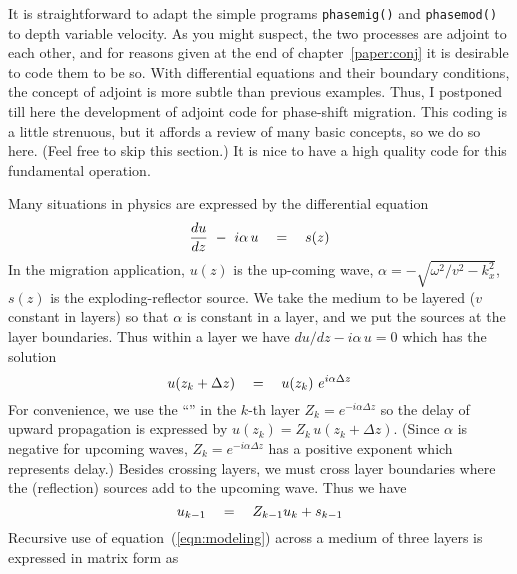 It is straightforward to adapt the simple programs
\texttt{phasemig()}  and
\texttt{phasemod()} 
to depth variable velocity.
As you might suspect, the two processes are adjoint to each other,
and for reasons given at the end of chapter~\ref{paper:conj}
it is desirable to code them to be so.
With differential equations and their boundary conditions,
the concept of adjoint is more subtle than previous examples.
Thus, I postponed till here the development of adjoint code
for phase-shift migration.
This coding is a little strenuous,
but it affords a review of many basic concepts,
so we do so here. (Feel free to skip this section.)
It is nice to have a high quality code for this fundamental operation.

\par
Many situations in physics are expressed by the differential equation
\begin{equation}
{du \over dz} \ - \  i \alpha \, u \quad =\quad s(z)
\end{equation}
In the migration application,
$u(z)$ is the up-coming wave,
$\alpha=-\sqrt{\omega^2 /v^2 - k_x^2}$,
$s(z)$ is the exploding-reflector source.
We take the medium to be layered
($v$ constant in layers)
so that $\alpha$ is constant in a layer,
and we put the sources at the layer boundaries.
Thus within a layer we have $du / dz - i \alpha \, u = 0$
which has the solution 
\begin{equation}
u(z_k+\Delta z ) \quad =\quad u(z_k)\  e^{i \alpha \Delta z}
\end{equation}
For convenience, we use the ``''
in the $k$-th layer
$Z_k= e^{-i \alpha \Delta z}$
so the delay of upward propagation is expressed by
$ u(z_k) = Z_k \, u(z_k+\Delta z )$.
(Since $\alpha$ is negative for upcoming waves,
$Z_k= e^{-i \alpha \Delta z}$
has a positive exponent which represents delay.)
Besides crossing layers, we must cross layer boundaries
where the (reflection) sources add to the upcoming wave.
Thus we have
\begin{equation}
u_{k-1} \quad =\quad Z_{k-1} u_k + s_{k-1}
\label{eqn:modeling}
\end{equation}
Recursive use of equation~(\ref{eqn:modeling}) across a medium
of three layers is expressed in matrix form as
